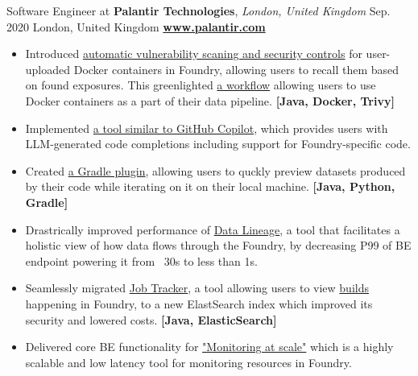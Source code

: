 \cveventflat
{Software Engineer at }
{\textbf{Palantir Technologies}, \textit{London, United Kingdom}}
{Sep. 2020}
{London, United Kingdom}
\newline
\href{https://www.palantir.com/}{\textbf{www.palantir.com}}
\begin{itemize}
    \item {
        Introduced
        \href{https://www.palantir.com/docs/foundry/administration/container-governance/}{automatic vulnerability scaning and security controls}
        for user-uploaded Docker containers in Foundry, allowing users to recall them based on found exposures.
        This greenlighted
        \href{https://www.palantir.com/docs/foundry/transforms-python/container-overview/}{a workflow}
        allowing users to use Docker containers as a part of their data pipeline.
    }
    \textbf{[Java, Docker, Trivy]}
    \item {
        Implemented
        \href{https://www.palantir.com/docs/foundry/code-repositories/aip-features/#code-autocomplete}{a tool similar to GitHub Copilot},
        which provides users with LLM-generated code completions including support for Foundry-specific code.
    }
    \item {
        Created
        \href{https://www.palantir.com/docs/foundry/transforms-common/local-preview/}{a Gradle plugin},
        allowing users to quckly preview datasets produced by their code while iterating on it on their local machine.
    }
    \textbf{[Java, Python, Gradle]}
    \item {
        Drastrically improved performance of
        \href{https://www.palantir.com/docs/foundry/data-lineage/overview/}{Data Lineage},
        a tool that facilitates a holistic view of how data flows through the Foundry,
        by decreasing P99 of BE endpoint powering it from ~30s to less than 1s.
    }
    \item {
        Seamlessly migrated
        \href{https://www.palantir.com/docs/foundry/data-integration/application-reference/#builds}{Job Tracker},
        a tool allowing users to view
        \href{https://www.palantir.com/docs/foundry/data-integration/builds/}{builds}
        happening in Foundry, to a new ElastSearch index which improved its security and lowered costs.
    }
    \textbf{[Java, ElasticSearch]}
    \item {
        Delivered core BE functionality for
        \href{https://www.palantir.com/docs/foundry/maintaining-pipelines/monitoring-views-intro/}{"Monitoring at scale"}
        which is a highly scalable and low latency tool for monitoring resources in Foundry.
}
\end{itemize}
